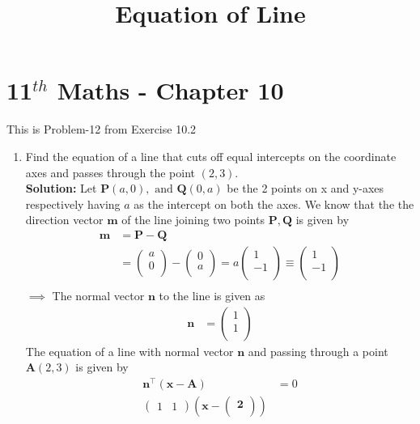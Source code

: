 \documentclass[12pt]{article}
\providecommand{\brak}[1]{\ensuremath{\left(#1\right)}}
\newcommand{\solution}{\noindent \textbf{Solution: }}
\newcommand{\myvec}[1]{\ensuremath{\begin{pmatrix}#1\end{pmatrix}}}
\let\vec\mathbf
\begin{document}
\begin{center}
\title{\textbf{Equation  of Line}}
\date{\vspace{-5ex}} %
\maketitle
\end{center}
\setcounter{page}{1}

\section{11$^{th}$ Maths - Chapter 10}
This is Problem-12 from Exercise 10.2
\begin{enumerate}
\item Find the equation of a line that cuts off equal intercepts on the coordinate axes and passes through the point $(2,3)$. \\ 
\solution 
Let $\vec{P}(a,0), \text{ and } \vec{Q}(0,a)$ be the 2 points on x and y-axes respectively having $a$ as the intercept on both the axes. We know that the the direction vector $\vec{m}$ of the line joining two points $\vec{P}, \vec{Q}$ is given by  
\begin{align}
\label{eq:1}
\vec{m} &=   \vec{P} - \vec{Q} \\
        &=   \myvec{
		a \\
		0 \\
		} - \myvec{
		   0 \\
		   a\\
		}  = a\myvec{ 
                     1 \\
		   -1 \\
        		}  \equiv \myvec{
                           1 \\
			   -1 \\
		         }   \\
\end{align}
$\implies$ The normal vector $\vec{n}$ to the line is given as
\begin{align}
\vec{n} &=  \myvec{
		     1 \\
		     1\\
	     } 
\end{align}
The equation of a line with normal vector $\vec{n}$ and passing through a point $\vec{A}(2,3)$ is given by
\begin{align}
	\vec{n}^\top\brak{\vec{x}-\vec{A}} &= 0 \\
	\myvec { 1 & 1 } \brak{ \vec{ x  - \myvec{ 2 \\
}}}
\end{align}
\end{enumerate}
\end{document}
